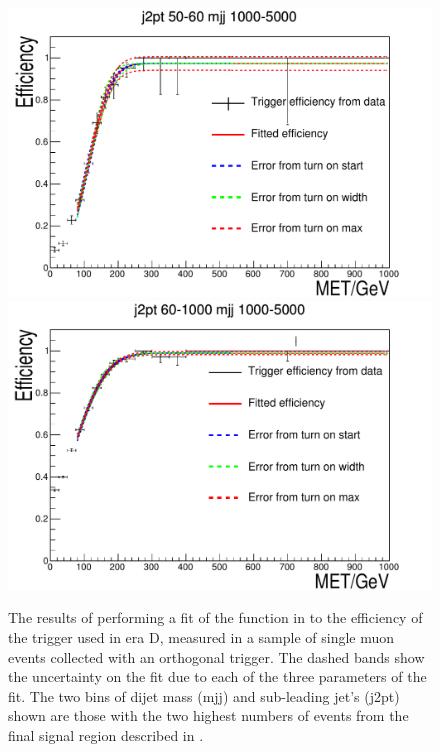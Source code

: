 \begin{figure}
  \includegraphics[width=.6\largefigwidth]{plots/parked/trigfitplots/hData_MET_1D_35D.pdf}
  \includegraphics[width=.6\largefigwidth]{plots/parked/trigfitplots/hData_MET_1D_45D.pdf}
  \caption{The results of performing a fit of the function in  to the efficiency of the trigger used in era D, measured in a sample of single muon events collected with an orthogonal trigger. The dashed bands show the uncertainty on the fit due to each of the three parameters of the fit. The two bins of dijet mass (mjj) and sub-leading jet's \pt (j2pt) shown are those with the two highest numbers of events from the final signal region described in .}
  \label{fig:parkedtrigeff}
\end{figure}

